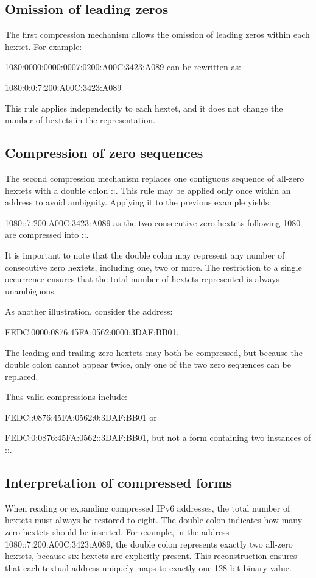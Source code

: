 \documentclass[11pt,a4paper,openany]{report}
\begin{document}
\subsection{Omission of leading zeros}

The first compression mechanism allows the omission of leading zeros within each hextet. For example:

1080:0000:0000:0007:0200:A00C:3423:A089 can be rewritten as:

1080:0:0:7:200:A00C:3423:A089

This rule applies independently to each hextet, and it does not change the number of hextets in the representation.

\subsection{Compression of zero sequences}

The second compression mechanism replaces one contiguous sequence of all-zero hextets with a double colon ::. This rule may be applied only once within an address to avoid ambiguity. Applying it to the previous example yields:

1080::7:200:A00C:3423:A089 as the two consecutive zero hextets following 1080 are compressed into ::.

It is important to note that the double colon may represent any number of consecutive zero hextets, including one, two or more. The restriction to a single occurrence ensures that the total number of hextets represented is always unambiguous.

As another illustration, consider the address:

FEDC:0000:0876:45FA:0562:0000:3DAF:BB01.

The leading and trailing zero hextets may both be compressed, but because the double colon cannot appear twice, only one of the two zero sequences can be replaced.

Thus valid compressions include:

FEDC::0876:45FA:0562:0:3DAF:BB01 or

FEDC:0:0876:45FA:0562::3DAF:BB01, but not a form containing two instances of ::.

\subsection{Interpretation of compressed forms}

When reading or expanding compressed IPv6 addresses, the total number of hextets must always be restored to eight. The double colon indicates how many zero hextets should be inserted. For example, in the address 1080::7:200:A00C:3423:A089, the double colon represents exactly two all-zero hextets, because six hextets are explicitly present. This reconstruction ensures that each textual address uniquely maps to exactly one 128-bit binary value.
\end{document}
